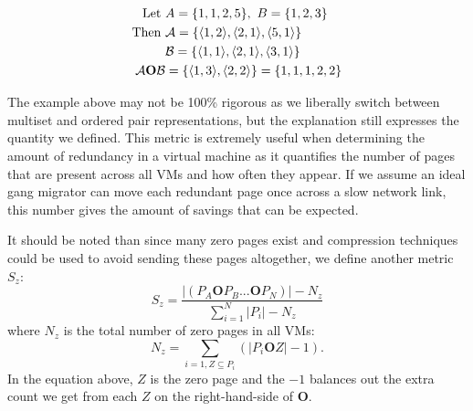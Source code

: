 \documentclass{acm_proc_article-sp}
\newcommand{\tup}[1]{\langle #1\rangle}
\begin{document}
\begin{align*}
\textrm{Let } & A = \{1,1,2,5\},~B = \{1,2,3\}\\
\textrm{Then } &{\cal A} = \{\tup{1,2}, \tup{2,1}, \tup{5,1}\}\\
& {\cal B} = \{\tup{1,1}, \tup{2,1}, \tup{3,1}\}\\
{\cal A} \mathbf{O} {\cal B} &= \{\tup{1,3}, \tup{2,2}\} = \{1,1,1,2,2\}
\end{align*}

The example above may not be 100\% rigorous as we liberally switch between multiset and ordered pair representations, but the explanation still expresses the quantity we defined.  This metric is extremely useful when determining the amount of redundancy in a virtual machine as it quantifies the number of pages that are present across all VMs and how often they appear.  If we assume an ideal gang migrator can move each redundant page once across a slow network link, this number gives the amount of savings that can be expected.

It should be noted than since many zero pages exist and compression techniques could be used to avoid sending these pages altogether\cite{live_adaptive_compress}, we define another metric $S_z$:
\begin{equation}
S_z = \frac{|(P_A \mathbf{O} P_B ... \mathbf{O} P_N)|-N_z}{\sum\limits_{i=1}^{N}|P_i|-N_z}
\end{equation}
where $N_z$ is the total number of zero pages in all VMs:
\begin{equation}
N_z = \sum\limits_{i=1,Z\subseteq P_i}\left(|P_i\mathbf{O}Z|-1\right).
\end{equation}\label{eqn:sz}
In the equation above, $Z$ is the zero page and the $-1$ balances out the extra count we get from each $Z$ on the right-hand-side of $\mathbf{O}$.
\end{document}
